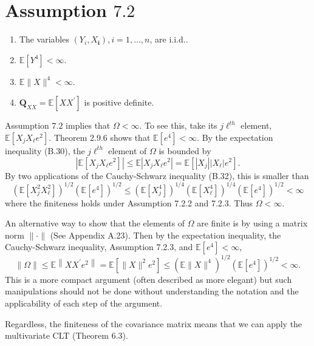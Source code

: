 \documentclass[10pt]{article}
\begin{document}
\section{Assumption $7.2$}
\begin{enumerate}
  \item The variables $\left(Y_{i}, X_{\boldsymbol{i}}\right), i=1, \ldots, n$, are i.i.d..

  \item $\mathbb{E}\left[Y^{4}\right]<\infty$.

  \item $\mathbb{E}\|X\|^{4}<\infty$.

  \item $\boldsymbol{Q}_{X X}=\mathbb{E}\left[X X^{\prime}\right]$ is positive definite.

\end{enumerate}
Assumption $7.2$ implies that $\Omega<\infty$. To see this, take its $j \ell^{t h}$ element, $\mathbb{E}\left[X_{j} X_{\ell} e^{2}\right]$. Theorem 2.9.6 shows that $\mathbb{E}\left[e^{4}\right]<\infty$. By the expectation inequality (B.30), the $j \ell^{t h}$ element of $\Omega$ is bounded by
$$
\left|\mathbb{E}\left[X_{j} X_{\ell} e^{2}\right]\right| \leq \mathbb{E}\left|X_{j} X_{\ell} e^{2}\right|=\mathbb{E}\left[\left|X_{j}\right|\left|X_{\ell}\right| e^{2}\right] .
$$
By two applications of the Cauchy-Schwarz inequality (B.32), this is smaller than
$$
\left(\mathbb{E}\left[X_{j}^{2} X_{\ell}^{2}\right]\right)^{1 / 2}\left(\mathbb{E}\left[e^{4}\right]\right)^{1 / 2} \leq\left(\mathbb{E}\left[X_{j}^{4}\right]\right)^{1 / 4}\left(\mathbb{E}\left[X_{\ell}^{4}\right]\right)^{1 / 4}\left(\mathbb{E}\left[e^{4}\right]\right)^{1 / 2}<\infty
$$
where the finiteness holds under Assumption 7.2.2 and 7.2.3. Thus $\Omega<\infty$.

An alternative way to show that the elements of $\Omega$ are finite is by using a matrix norm $\|\cdot\|$ (See Appendix A.23). Then by the expectation inequality, the Cauchy-Schwarz inequality, Assumption 7.2.3, and $\mathbb{E}\left[e^{4}\right]<\infty$,
$$
\|\Omega\| \leq \mathbb{E}\left\|X X^{\prime} e^{2}\right\|=\mathbb{E}\left[\|X\|^{2} e^{2}\right] \leq\left(\mathbb{E}\|X\|^{4}\right)^{1 / 2}\left(\mathbb{E}\left[e^{4}\right]\right)^{1 / 2}<\infty .
$$
This is a more compact argument (often described as more elegant) but such manipulations should not be done without understanding the notation and the applicability of each step of the argument.

Regardless, the finiteness of the covariance matrix means that we can apply the multivariate CLT (Theorem 6.3).
\end{document}
